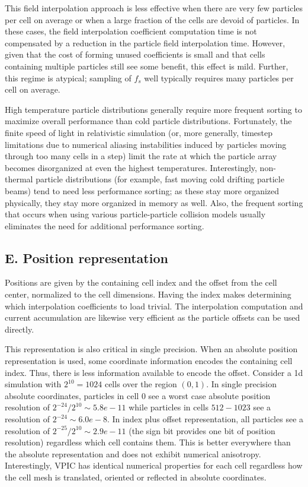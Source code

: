 \documentclass[letter,10pt]{article}
\begin{document}
This field interpolation approach is less effective when there are
very few particles per cell on average or when a large fraction of the
cells are devoid of particles.  In these cases, the field
interpolation coefficient computation time is not compensated by a
reduction in the particle field interpolation time.  However, given
that the cost of forming unused coefficients is small and that cells
containing multiple particles still see some benefit, this effect is
mild.  Further, this regime is atypical; sampling of $f_s$ well
typically requires many particles per cell on average.

High temperature particle distributions generally require more
frequent sorting to maximize overall performance than cold particle
distributions.  Fortunately, the finite speed of light in relativistic
simulation (or, more generally, timestep limitations due to numerical
aliasing instabilities induced by particles moving through too many
cells in a step) limit the rate at which the particle array becomes
disorganized at even the highest temperatures.  Interestingly,
non-thermal particle distributions (for example, fast moving cold
drifting particle beams) tend to need less performance sorting; as
these stay more organized physically, they stay more organized in
memory as well.  Also, the frequent sorting that occurs when using
various particle-particle collision models usually eliminates the need
for additional performance sorting.

\subsection{E. Position representation}

Positions are given by the containing cell index and the offset from
the cell center, normalized to the cell dimensions.  Having the index
makes determining which interpolation coefficients to load trivial.
The interpolation computation and current accumulation are likewise
very efficient as the particle offsets can be used directly.

This representation is also critical in single precision.  When an
absolute position representation is used, some coordinate information
encodes the containing cell index.  Thus, there is less information
available to encode the offset.  Consider a 1d simulation with $2^{10}
= 1024$ cells over the region $(0,1)$.  In single precision absolute
coordinates, particles in cell $0$ see a worst case absolute position
resolution of $2^{-24}/2^{10} \sim 5.8e-11$ while particles in cells
$512-1023$ see a resolution of $2^{-24} \sim 6.0e-8$.  In index plus
offset representation, all particles see a resolution of
$2^{-25}/2^{10} \sim 2.9e-11$ (the sign bit provides one bit of
position resolution) regardless which cell contains them.  This is
better everywhere than the absolute representation and does not
exhibit numerical anisotropy.  Interestingly, VPIC has identical
numerical properties for each cell regardless how the cell mesh is
translated, oriented or reflected in absolute coordinates.
\end{document}
